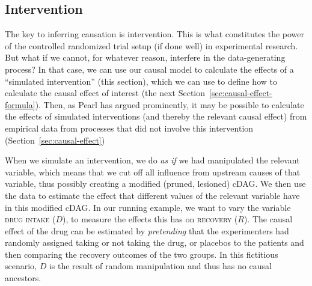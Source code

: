 \documentclass[nobib]{tufte-handout}
\begin{document}
\subsection{Intervention} \label{sec:intervention}

The key to inferring causation is intervention.
This is what constitutes the power of the controlled randomized trial setup (if done well) in experimental research.
But what if we cannot, for whatever reason, interfere in the data-generating process?
In that case, we can use our causal model to calculate the effects of a ``simulated intervention'' (this section), which we can use to define how to calculate the causal effect of interest (the next Section~\ref{sec:causal-effect-formula}).
Then, as Pearl has argued prominently, it may be possible to calculate the effects of simulated interventions (and thereby the relevant causal effect) from empirical data from processes that did not involve this intervention (Section~\ref{sec:causal-effect})




When we simulate an intervention, we do \textit{as if} we had manipulated the relevant variable, which means that we cut off all influence from upstream causes of that variable, thus possibly creating a modified (pruned, lesioned) cDAG.
We then use the data to estimate the effect that different values of the relevant variable have in this modified cDAG.
In our running example, we want to vary the variable \textsc{drug intake} ($D$), to measure the effects this has on \textsc{recovery} ($R$).
The causal effect of the drug can be estimated by \textit{pretending} that the experimenters had randomly assigned taking or not taking the drug, or placebos to the patients and then comparing the recovery outcomes of the two groups.
In this fictitious scenario, $D$ is the result of random manipulation and thus has no causal ancestors.
\end{document}
